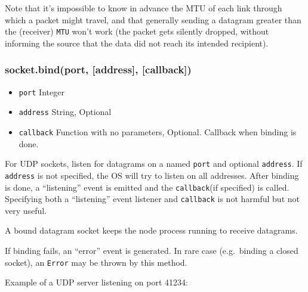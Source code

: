 Note that it's impossible to know in advance the MTU of each link
through which a packet might travel, and that generally sending a
datagram greater than the (receiver) \texttt{MTU} won't work (the packet
gets silently dropped, without informing the source that the data did
not reach its intended recipient).

\subsubsection{socket.bind(port, {[}address{]}, {[}callback{]})}

\begin{itemize}
\item
  \texttt{port} Integer
\item
  \texttt{address} String, Optional
\item
  \texttt{callback} Function with no parameters, Optional. Callback when
  binding is done.
\end{itemize}

For UDP sockets, listen for datagrams on a named \texttt{port} and
optional \texttt{address}. If \texttt{address} is not specified, the OS
will try to listen on all addresses. After binding is done, a
``listening'' event is emitted and the \texttt{callback}(if specified)
is called. Specifying both a ``listening'' event listener and
\texttt{callback} is not harmful but not very useful.

A bound datagram socket keeps the node process running to receive
datagrams.

If binding fails, an ``error'' event is generated. In rare case
(e.g.~binding a closed socket), an \texttt{Error} may be thrown by this
method.

Example of a UDP server listening on port 41234:

